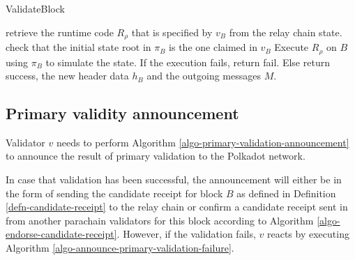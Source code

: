 \begin{algorithm}
  \caption[]{\sc ValidateBlock}
  \label{algo-validate-block}
  \begin{algorithmic}[1]
    \State retrieve the runtime code $R_\rho$ that is specified by $v_B$ from the relay chain state.
    \State check that the initial state root in $\pi_B$ is the one claimed in $v_B$
    \State Execute $R_\rho$ on $B$ using $\pi_B$ to simulate the state.
    \State If the execution fails, return fail.
    \State Else return success, the new header data $h_B$ and the outgoing messages $M$. 
  \end{algorithmic}
\end{algorithm}

\subsection{Primary validity announcement}
\label{sect-primary-validaty-announcement}
Validator $v$ needs to perform Algorithm \ref{algo-primary-validation-announcement} to announce the result of primary validation to the Polkadot network.
\newline

In case that validation has been successful, the announcement will either be in
the form of sending the candidate receipt for block $B$ as defined in Definition
\ref{defn-candidate-receipt} to the relay chain or confirm a candidate receipt
sent in from another parachain validators for this block according to Algorithm
\ref{algo-endorse-candidate-receipt}. However, if the validation fails, $v$
reacts by executing Algorithm \ref{algo-announce-primary-validation-failure}.

